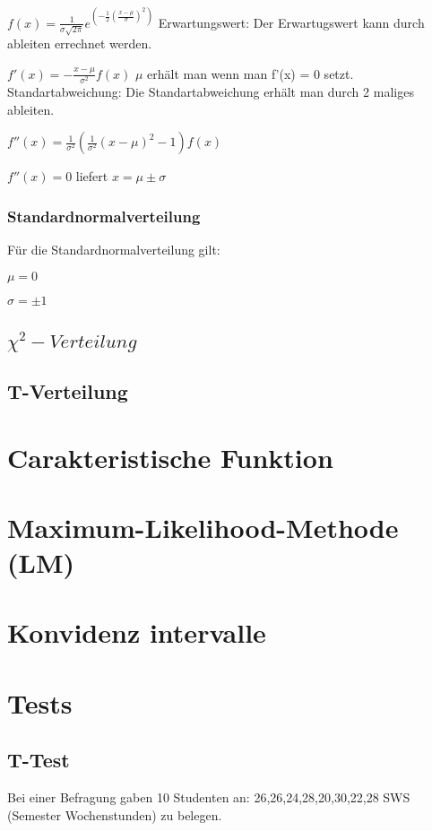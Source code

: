 \documentclass[a4paper, 11pt]{article}
\begin{document}
$f(x) = \frac{1} {\sigma \sqrt{2\pi}} e^{(-\frac{1}{2}(\frac{x-\mu}{\sigma})^2)}$
\newline\newline Erwartungswert:
\newline Der Erwartugswert kann durch ableiten errechnet werden.

$f'(x) = -\frac{x-\mu} {\sigma^2} f(x)$
$\mu$ erhält man wenn man f'(x) = 0 setzt.
\newline\newline Standartabweichung:
\newline Die Standartabweichung erhält man durch 2 maliges ableiten.


$f''(x) = \frac{1}{\sigma^2} (\frac{1}{\sigma^2} (x-\mu)^2 - 1) f(x)$


$f''(x) = 0 $ liefert $ x = \mu \pm \sigma$

\subsubsection{Standardnormalverteilung}
Für die Standardnormalverteilung gilt:


$\mu = 0$


$\sigma = \pm 1$

\subsection{$\chi^2-Verteilung$}
\subsection{T-Verteilung}
\section{Carakteristische Funktion}
\section{Maximum-Likelihood-Methode (LM)}
\section{Konvidenz intervalle}
\section{Tests}
\subsection{T-Test}
Bei einer Befragung gaben 10 Studenten an: 26,26,24,28,20,30,22,28 SWS (Semester Wochenstunden) zu belegen.
\end{document}
